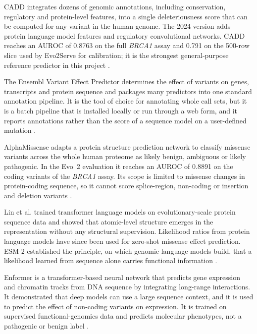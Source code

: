 CADD integrates dozens of genomic annotations, including conservation, regulatory and protein-level features, into a single deleteriousness score that can be computed for any variant in the human genome. The 2024 version adds protein language model features and regulatory convolutional networks. CADD reaches an AUROC of 0.8763 on the full \textit{BRCA1} assay and 0.791 on the 500-row slice used by Evo2Serve for calibration; it is the strongest general-purpose reference predictor in this project \cite{rentzsch2019cadd,schubach2024cadd}.

The Ensembl Variant Effect Predictor determines the effect of variants on genes, transcripts and protein sequence and packages many predictors into one standard annotation pipeline. It is the tool of choice for annotating whole call sets, but it is a batch pipeline that is installed locally or run through a web form, and it reports annotations rather than the score of a sequence model on a user-defined mutation \cite{mclaren2016vep}.

AlphaMissense adapts a protein structure prediction network to classify missense variants across the whole human proteome as likely benign, ambiguous or likely pathogenic. In the Evo~2 evaluation it reaches an AUROC of 0.8891 on the coding variants of the \textit{BRCA1} assay. Its scope is limited to missense changes in protein-coding sequence, so it cannot score splice-region, non-coding or insertion and deletion variants \cite{cheng2023alphamissense}.

Lin et al. trained transformer language models on evolutionary-scale protein sequence data and showed that atomic-level structure emerges in the representation without any structural supervision. Likelihood ratios from protein language models have since been used for zero-shot missense effect prediction. ESM-2 established the principle, on which genomic language models build, that a likelihood learned from sequence alone carries functional information \cite{lin2023esm2}.

Enformer is a transformer-based neural network that predicts gene expression and chromatin tracks from DNA sequence by integrating long-range interactions. It demonstrated that deep models can use a large sequence context, and it is used to predict the effect of non-coding variants on expression. It is trained on supervised functional-genomics data and predicts molecular phenotypes, not a pathogenic or benign label \cite{avsec2021enformer}.

